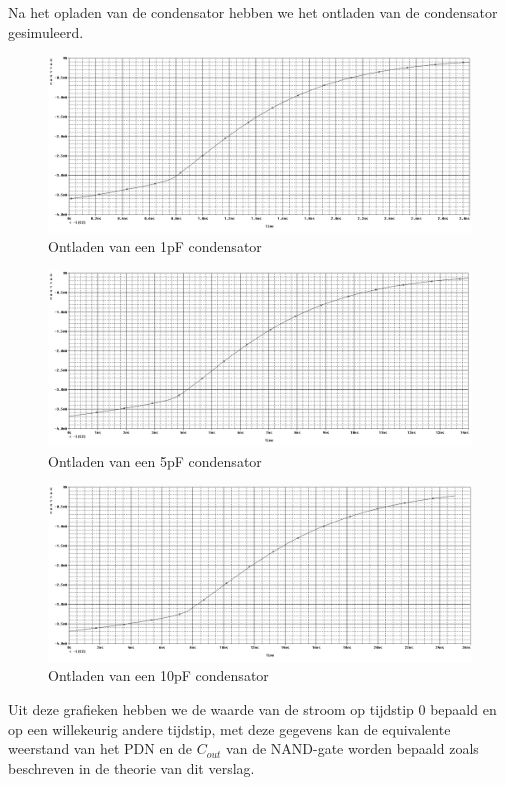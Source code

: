 \documentclass{article}
\begin{document}
Na het opladen van de condensator hebben we het ontladen van de condensator gesimuleerd.

\begin{figure}[H]
	\centering
	\includegraphics[scale=0.4]{figures/ontladen1p}
	\caption{Ontladen van een 1pF condensator}
\end{figure}

\begin{figure}[H]
	\centering
	\includegraphics[scale=0.4]{figures/ontladen5p}
	\caption{Ontladen van een 5pF condensator}
\end{figure}

\begin{figure}[H]
	\centering
	\includegraphics[scale=0.4]{figures/ontladen10p}
	\caption{Ontladen van een 10pF condensator}
\end{figure}

Uit deze grafieken hebben we de waarde van de stroom op tijdstip 0 bepaald en op een willekeurig andere tijdstip, met deze gegevens kan de equivalente weerstand van het PDN en de $C_{out}$ van de NAND-gate worden bepaald zoals beschreven in de theorie van dit verslag.
\end{document}
